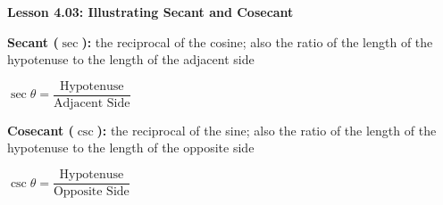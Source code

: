 \begin{center}
\textbf{Lesson 4.03: Illustrating Secant and Cosecant}
\end{center}

\vspace*{-1.5ex}

\noindent \textbf{Secant ($\sec$):} the reciprocal of the cosine; also the ratio of the length of the hypotenuse to the length of the adjacent side

{\centering $
    \sec \theta = \dfrac{\text{Hypotenuse}}{\text{Adjacent Side}}
$\par}

\noindent  \textbf{Cosecant ($\csc$):} the reciprocal of the sine; also the ratio of the length of the hypotenuse to the length of the opposite side

{\centering $
    \csc \theta = \dfrac{\text{Hypotenuse}}{\text{Opposite Side}}
$\par}

